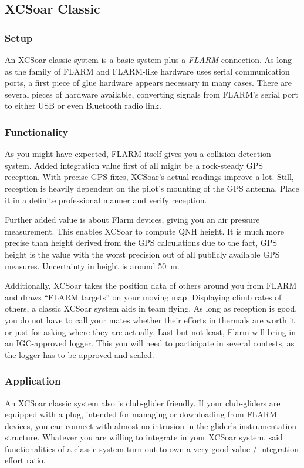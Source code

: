 \subsection*{XCSoar Classic}
\subsubsection*{Setup} An XCSoar classic system is a basic system plus a 
\emph{FLARM} connection. As long as the family of FLARM and FLARM-like hardware
uses serial communication ports, a first piece of glue hardware appears necessary 
in many cases. There are several pieces of hardware available, converting signals 
from FLARM's serial port to either USB or even Bluetooth radio link.

\subsubsection*{Functionality} As you might have expected, FLARM itself gives you
a collision detection system. Added integration value first of all might be a 
rock-steady GPS reception. With precise GPS fixes, XCSoar's actual readings 
improve a lot. Still, reception is heavily dependent on the pilot's mounting of 
the GPS antenna. Place it in a definite professional manner and verify reception.

Further added value is about Flarm devices, giving you an air pressure 
measurement. This enables XCSoar to compute QNH height. It is much more precise 
than height derived from the GPS calculations due to the fact, GPS height is the 
value with the worst precision out of all publicly available GPS measures. 
Uncertainty in height is around 50~m.

Additionally, XCSoar takes the position data of others around you from FLARM and
draws ``FLARM targets'' on your moving map. Displaying climb rates of
others, a classic XCSoar system aids in team flying. As long as reception is 
good, you do not have to call your mates whether their efforts in thermals are 
worth it or just for asking where they are actually. Last but not least, Flarm 
will bring in an IGC-approved logger. This you will need to participate in 
several contests, as the logger has to be approved and sealed.

\subsubsection*{Application} An XCSoar classic system also is club-glider 
friendly. If your club-gliders are equipped with a plug, intended for managing or 
downloading from FLARM devices, you can connect with almost no intrusion in the
glider's instrumentation structure. Whatever you are willing to integrate in your 
XCSoar system, said functionalities of a classic system turn out to own a very 
good value / integration effort ratio.

